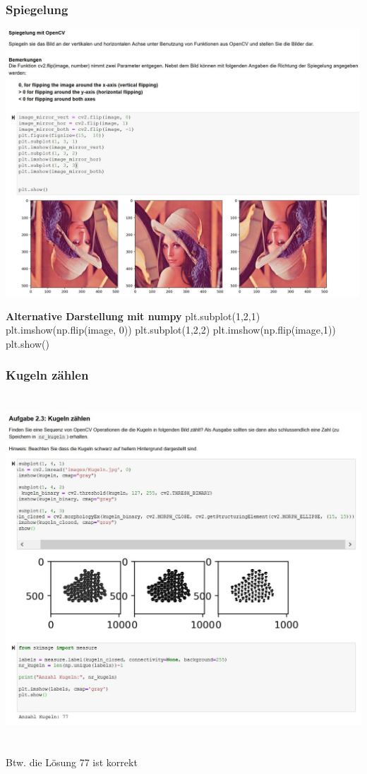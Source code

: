 \subsubsection{Spiegelung} 
\begin{center}
	\includegraphics[height=10cm,keepaspectratio]{images/sw01/SpiegelungMitOpenCV.JPG}
\end{center}
\noindent
\textbf{Alternative Darstellung mit numpy} \newline
plt.subplot(1,2,1) \newline
plt.imshow(np.flip(image, 0)) \newline
plt.subplot(1,2,2) \newline
plt.imshow(np.flip(image,1)) \newline
plt.show()

\subsubsection{Kugeln zählen} 
\begin{center}
	\includegraphics[height=13cm,keepaspectratio]{images/sw01/KugelnZaehlen.JPG}
\end{center}
Btw. die Lösung 77 ist korrekt








